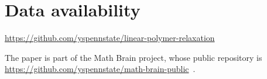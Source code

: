 \section*{Data availability}
\url{https://github.com/yspennstate/linear-polymer-relaxation}

The paper is part of the Math Brain project, whose public repository is \url{https://github.com/yspennstate/math-brain-public}~\cite{MathBrainRepo}.

